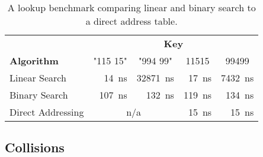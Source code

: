 \documentclass[a4paper, 11pt]{article}
\begin{document}
    \begin{table}[h]
        \centering
        \small
\begin{tabular}{lrrrr} %
    \toprule
    & \multicolumn{4}{c}{\textbf{Key}} \\\cmidrule(lr){2-5}
    \textbf{Algorithm} & \multicolumn{1}{c}{"115 15"} &\multicolumn{1}{c}{"994 99"}& \multicolumn{1}{c}{\num{11515}}&\multicolumn{1}{c}{\num{99499}}\\
    \cmidrule(lr){1-1}
    \cmidrule(lr){2-5}
    Linear Search      &\SI{14}{\nano\second}   &\SI{32871}{\nano\second}   &\SI{17}{\nano\second}  &\SI{7432}{\nano\second}\\
    Binary Search      &\SI{107}{\nano\second}  &\SI{132}{\nano\second}     &\SI{119}{\nano\second} &\SI{134}{\nano\second} \\
    Direct Addressing  & \multicolumn{2}{c}{n/a}                       &\SI{15}{\nano\second}  &\SI{15}{\nano\second}  \\
    \bottomrule
\end{tabular}
    \caption{A lookup benchmark comparing linear and binary search to a direct address table.
    } %
    \label{tab:lookup} %
    \end{table}

    \subsection*{Collisions}
\end{document}
